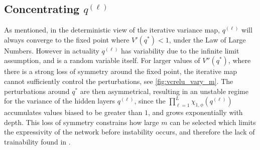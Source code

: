 \documentclass{article}
\theoremstyle{plain}
\theoremstyle{definition}
\theoremstyle{remark}
\begin{document}


\subsection{{\texorpdfstring{Concentrating $q^{(\ell)}$}{Concentrating q}}}\label{sec:reducing_vprimeprime}

As mentioned, in the deterministic view of the iterative variance map, $q^{(\ell)}$ will always converge to the fixed point where $V'(q^*)<1$,  under the Law of Large Numbers. However in actuality $q^{(\ell)}$ has variability due to the infinite limit assumption, and is a random variable itself. 
For larger values of $V''(q^*)$, where there is a strong loss of symmetry around the fixed point, the iterative map cannot sufficiently control the perturbations, see \cref{fig:vcrelu_vary_m}. The perturbations around $q^*$ are then asymmetrical, resulting in an unstable regime for the variance of the hidden layers $q^{(\ell)}$, since the $\prod_{\ell=1}^L{\chi}_{1, \phi}(q^{(\ell)})$ accumulates values biased to be greater than $1$, and grows exponentially with depth. This loss of symmetry constrains how large $m$ can be selected which limits the expressivity of the network before instability occurs, and therefore the lack of trainability found in \cite{price_deep_2023}.
\end{document}
